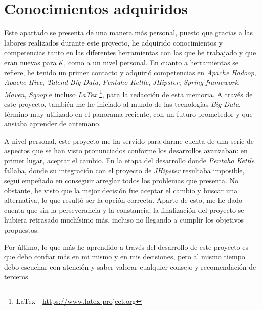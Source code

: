 \section{Conocimientos adquiridos} \label{conclusiones.conocimientos}
Este apartado se presenta de una manera más personal, puesto que gracias a las labores realizados durante este proyecto, he adquirido conocimientos y competencias tanto en las diferentes herramientas con las que he trabajado y que eran nuevas para él, como a un nivel personal. En cuanto a herramientas se refiere, he tenido un primer contacto y adquirió competencias en \textit{Apache Hadoop}, \textit{Apache Hive}, \textit{Talend Big Data}, \textit{Pentaho Kettle}, \textit{JHipster}, \textit{Spring framework}, \textit{Maven}, \textit{Sqoop} e incluso \textit{LaTex} \footnote{LaTex - \url{https://www.latex-project.org}}, para la redacción de esta memoria. A través de este proyecto, también me he iniciado al mundo de las tecnologías \textit{Big Data}, término muy utilizado en el panorama reciente,  con un futuro prometedor y que ansiaba aprender de antemano. 
\par 
A nivel personal, este proyecto me ha servido para darme cuenta de una serie de aspectos que se han visto pronunciados conforme los desarrollos avanzaban: en primer lugar, aceptar el cambio. En la etapa del desarrollo donde \textit{Pentaho Kettle} fallaba, donde su integración con el proyecto de \textit{JHipster} resultaba imposible, seguí empeñado en conseguir arreglar todos los problemas que presenta. No obstante, he visto que la mejor decisión fue aceptar el cambio y buscar una alternativa, lo que resultó ser la opción correcta. Aparte de esto, me he dado cuenta que sin la perseverancia y la constancia, la finalización del proyecto se hubiera retrasado muchísimo más, incluso no llegando a cumplir los objetivos propuestos. 
\par Por último, lo que más he aprendido a través del desarrollo de este proyecto es que debo confiar más en mi mismo y en mis decisiones, pero al mismo tiempo debo escuchar con atención y saber valorar cualquier consejo y recomendación de terceros. 

 
